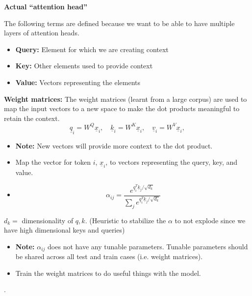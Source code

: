 \begin{definition}
    \textbf{Actual ``attention head''}
    \vspace{1em}

The following terms are defined because we want to be able to have multiple layers of attention heads.
\begin{itemize}
    \item \textbf{Query:} Element for which we are creating context
    \item \textbf{Key:} Other elements used to provide context
    \item \textbf{Value:} Vectors representing the elements
\end{itemize}
\vspace{1em}

\textbf{Weight matrices:} The weight matrices (learnt from a large corpus) are used to map the input vectors to a new space to make the dot products meaningful to retain the context.
\[
\underline{q}_i = W^Q \underline{x}_i, \quad \underline{k}_i = W^K \underline{x}_i, \quad \underline{v}_i = W^V \underline{x}_i,
\]

\begin{itemize}
    \item \textbf{Note:} New vectors will provide more context to the dot product.
    \item Map the vector for token $i$, $\underline{x}_i$, to vectors representing the query, key, and value.
    \item \[
        \alpha_{ij} = \frac{e^{\underline{q}_i^T \underline{k}_j / \sqrt{d_k}}}{\sum_j e^{\underline{q}_i^T \underline{k}_j / \sqrt{d_k}}}
    \]
\end{itemize}

$d_k = $ dimensionality of $q, k$. (Heuristic to stabilize the $\alpha$ to not explode since we have high dimensional keys and queries)
\begin{itemize}
    \item \textbf{Note:} $\alpha_{ij}$ does not have any tunable parameters. Tunable parameters should be shared across all test and train cases (i.e. weight matrices).
    \item Train the weight matrices to do useful things with the model. 
\end{itemize}
    .
\end{definition}


